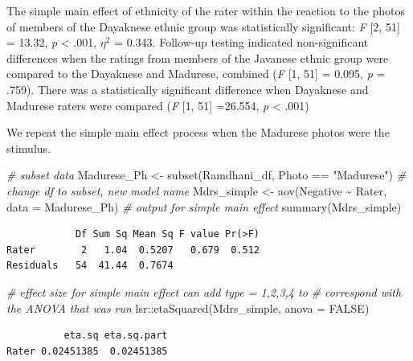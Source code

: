 \documentclass[
  11pt,
]{book}
\newenvironment{Shaded}{\begin{snugshade}}{\end{snugshade}}
\newcommand{\AttributeTok}[1]{\textcolor[rgb]{0.77,0.63,0.00}{#1}}
\newcommand{\CommentTok}[1]{\textcolor[rgb]{0.56,0.35,0.01}{\textit{#1}}}
\newcommand{\ConstantTok}[1]{\textcolor[rgb]{0.00,0.00,0.00}{#1}}
\newcommand{\FunctionTok}[1]{\textcolor[rgb]{0.00,0.00,0.00}{#1}}
\newcommand{\NormalTok}[1]{#1}
\newcommand{\OtherTok}[1]{\textcolor[rgb]{0.56,0.35,0.01}{#1}}
\newcommand{\SpecialCharTok}[1]{\textcolor[rgb]{0.00,0.00,0.00}{#1}}
\newcommand{\StringTok}[1]{\textcolor[rgb]{0.31,0.60,0.02}{#1}}
\begin{document}
The simple main effect of ethnicity of the rater within the reaction to the photos of members of the Dayaknese ethnic group was statistically significant: \emph{F} {[}2, 51{]} = 13.32, \emph{p} \textless{} .001, \(\eta ^{2}\) = 0.343. Follow-up testing indicated non-significant differences when the ratings from members of the Javanese ethnic group were compared to the Dayaknese and Madurese, combined (\emph{F} {[}1, 51{]} = 0.095, \emph{p} = .759). There was a statistically significant difference when Dayaknese and Madurese raters were compared (\emph{F} {[}1, 51{]} =26.554, \emph{p} \textless{} .001)

We repeat the simple main effect process when the Madurese photos were the stimulus.

\begin{Shaded}
\begin{Highlighting}[]
\CommentTok{\# subset data}
\NormalTok{Madurese\_Ph }\OtherTok{\textless{}{-}} \FunctionTok{subset}\NormalTok{(Ramdhani\_df, Photo }\SpecialCharTok{==} \StringTok{"Madurese"}\NormalTok{)}
\CommentTok{\# change df to subset, new model name}
\NormalTok{Mdrs\_simple }\OtherTok{\textless{}{-}} \FunctionTok{aov}\NormalTok{(Negative }\SpecialCharTok{\textasciitilde{}}\NormalTok{ Rater, }\AttributeTok{data =}\NormalTok{ Madurese\_Ph)}
\CommentTok{\# output for simple main effect}
\FunctionTok{summary}\NormalTok{(Mdrs\_simple)}
\end{Highlighting}
\end{Shaded}

\begin{verbatim}
            Df Sum Sq Mean Sq F value Pr(>F)
Rater        2   1.04  0.5207   0.679  0.512
Residuals   54  41.44  0.7674               
\end{verbatim}

\begin{Shaded}
\begin{Highlighting}[]
\CommentTok{\# effect size for simple main effect can add \textquotesingle{}type = 1,2,3,4\textquotesingle{} to}
\CommentTok{\# correspond with the ANOVA that was run}
\NormalTok{lsr}\SpecialCharTok{::}\FunctionTok{etaSquared}\NormalTok{(Mdrs\_simple, }\AttributeTok{anova =} \ConstantTok{FALSE}\NormalTok{)}
\end{Highlighting}
\end{Shaded}

\begin{verbatim}
          eta.sq eta.sq.part
Rater 0.02451385  0.02451385
\end{verbatim}
\end{document}
